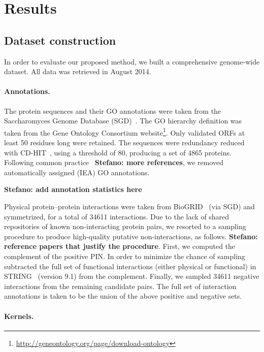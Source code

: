\documentclass{bioinfo}
\newcommand{\stefano}[1]{{\bf \textcolor{alizarin}{{Stefano: #1}}}}
\begin{document}
\section{Results}

\subsection{Dataset construction}

In order to evaluate our proposed method, we built a comprehensive genome-wide
dataset. All data was retrieved in August 2014.

\paragraph{Annotations.}

The protein sequences and their GO annotations were taken from the
Saccharomyces Genome Database (SGD)~\cite{cherry2012sgd}. The GO hierarchy
definition was taken from the Gene Ontology Consortium website\footnote{
\url{http://geneontology.org/page/download-ontology}}. Only validated ORFs at
least 50 residues long were retained. The sequences were redundancy reduced
with CD-HIT~\cite{fu2012cdhit}, using a threshold of 80, producing a set of
4865 proteins. Following common practice~\cite{gong2016gofdr} \stefano{more
references}, we removed automatically assigned (IEA) GO annotations.

\stefano{add annotation statistics here}

Physical protein--protein interactions were taken from
BioGRID~\cite{chatr2015biogrid} (via SGD) and symmetrized, for a total of 34611
interactions. Due to the lack of shared repositories of known non-interacting
protein pairs, we resorted to a sampling procedure to produce high-quality
putative non-interactions, as follows.  \stefano{reference papers that justify
the procedure}.  First, we computed the complement of the positive PIN. In
order to minimize the chance of sampling subtracted the full set of functional
interactions (either physical or functional) in
STRING~\cite{franceschini2013string91,szklarczyk2014string10} (version 9.1)
from the complement. Finally, we sampled 34611 negative interactions from the
remaining candidate pairs. The full set of interaction annotations is taken to
be the union of the above positive and negative sets.

\paragraph{Kernels.}
\end{document}
